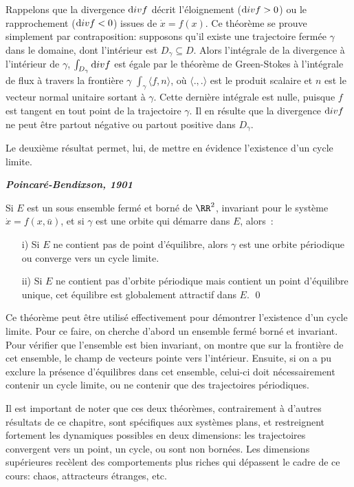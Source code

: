 Rappelons que la divergence  ${\mbox div}f$ décrit l'éloignement (${\mbox div}f >0$) ou le rapprochement (${\mbox div}f <0$) issues de $\dot{x}=f(x)$.
Ce théorème se prouve simplement par contraposition: supposons qu'il existe une trajectoire fermée $\gamma$ dans le domaine, dont l'intérieur est $D_{\gamma} \subseteq D$. Alors 
l'intégrale de la divergence à l'intérieur de $\gamma$, $\int_{D_\gamma}  {\mbox div}f$ est égale par le théorème de Green-Stokes à l'intégrale de flux à travers la frontière $\gamma$ $\int_\gamma \langle f, n \rangle$, où $\langle.,.\rangle$ est le produit scalaire et $n$ est le vecteur normal unitaire sortant à $\gamma$. Cette dernière intégrale est nulle, puisque $f$ est tangent en tout point de la trajectoire $\gamma$. Il en résulte que la divergence ${\mbox div}f$ ne peut être partout négative ou partout positive dans $D_{\gamma}$.

Le deuxi{è}me r{é}sultat permet, lui, de mettre en {é}vidence l'existence d'un cycle
limite.  

\begin{theoreme} {\bf \em Poincar{é}-Bendixson, 1901}

Si $E$ est un sous ensemble fermé et borné de $\RR^2$, invariant  pour le système
$\dot x= f(x,\bar u)$, et si $\gamma$ est une orbite qui d{é}marre dans $E$, alors~:
\begin{itemize}
\item[i)] Si $E$ ne contient pas de point d'{é}quilibre, alors $\gamma$ est une orbite
p{é}riodique ou converge vers un cycle limite.
\item[ii)]Si $E$ ne contient pas d'orbite p{é}riodique mais contient un point d'{é}quilibre
unique, cet {é}quilibre est globalement attractif dans $E$. \qed
\end{itemize}
\end{theoreme}


Ce th{é}or{è}me peut {ê}tre utilis{é} effectivement pour d{é}montrer l'existence d'un
cycle limite. Pour ce faire, on cherche d'abord un ensemble ferm{é} born{é} et invariant.
Pour v{é}rifier que l'ensemble est bien invariant, on montre que sur la fronti{è}re de cet
ensemble, le champ de vecteurs pointe vers l'int{é}rieur. Ensuite, si on a pu exclure la
pr{é}sence d'{é}quilibres dans cet ensemble, celui-ci doit n{é}cessairement contenir un
cycle limite, ou ne contenir que des trajectoires p{é}riodiques.

Il est important de noter que ces deux théorèmes, contrairement à d'autres résultats de ce chapitre, sont spécifiques aux systèmes plans, et restreignent fortement les dynamiques possibles en deux dimensions: les trajectoires convergent vers un point, un cycle, ou sont non bornées. Les dimensions supérieures recèlent des comportements plus riches qui dépassent le cadre de ce cours: chaos, attracteurs étranges, etc.

